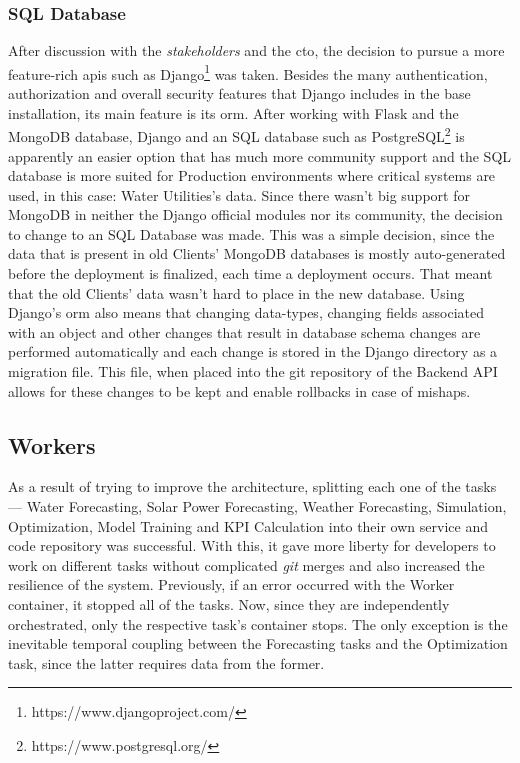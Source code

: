 \subsubsection{SQL Database}\label{methodology:sss:sql-database}
After discussion with the \textit{stakeholders} and the \gls{cto}, the decision to pursue a more feature-rich \glspl{api} such as Django\footnote{https://www.djangoproject.com/\label{foot:django}} was taken. Besides the many authentication, authorization and overall security features that Django includes in the base installation, its main feature is its \gls{orm}. After working with Flask and the MongoDB database, Django and an SQL database such as PostgreSQL\footnote{https://www.postgresql.org/\label{foot:postgresql}} is apparently an easier option that has much more community support and the SQL database is more suited for Production environments where critical systems are used, in this case: Water Utilities's data. Since there wasn't big support for MongoDB in neither the Django official modules nor its community, the decision to change to an SQL Database was made. This was a simple decision, since the data that is present in old Clients' MongoDB databases is mostly auto-generated before the deployment is finalized, each time a deployment occurs. That meant that the old Clients' data wasn't hard to place in the new database.
Using Django's \gls{orm} also means that changing data-types, changing fields associated with an object and other changes that result in database schema changes are performed automatically and each change is stored in the Django directory as a migration file. This file, when placed into the git repository of the Backend API allows for these changes to be kept and enable rollbacks in case of mishaps.

\subsection{Workers}\label{methodology:ss:workers}

As a result of trying to improve the architecture, splitting each one of the tasks --- Water Forecasting, Solar Power Forecasting, Weather Forecasting, Simulation, Optimization, Model Training and KPI Calculation into their own service and code repository was successful. With this, it gave more liberty for developers to work on different tasks without complicated \textit{git} merges and also increased the resilience of the system. Previously, if an error occurred with the Worker container, it stopped all of the tasks. Now, since they are independently orchestrated, only the respective task's container stops. The only exception is the inevitable temporal coupling between the Forecasting tasks and the Optimization task, since the latter requires data from the former.

